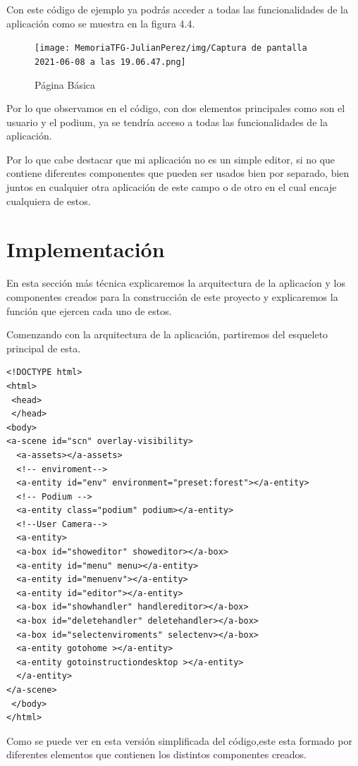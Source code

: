 \documentclass[a4paper, 12pt]{book}
\begin{document}
Con este código de ejemplo ya podrás acceder a todas las funcionalidades de la aplicación como se muestra en la figura 4.4.

\begin{figure}[H]
  \centering
  \texttt{[image: MemoriaTFG-JulianPerez/img/Captura de pantalla 2021-06-08 a las 19.06.47.png]}
  \caption{Página Básica }\label{home}
\end{figure}

Por lo que observamos en el código, con dos elementos principales como son el usuario y el podium, ya se tendría acceso a todas las funcionalidades de la aplicación.

Por lo que cabe destacar que mi aplicación no es un simple editor, si no que contiene diferentes componentes que pueden ser usados bien por separado, bien juntos en cualquier otra aplicación de este campo o de otro en el cual encaje cualquiera de estos.

\section{Implementación} 
\label{sec:Arquitectura resultante}
En esta sección más técnica explicaremos la arquitectura de la aplicacíon y los componentes creados para la construcción de este proyecto y explicaremos la función que ejercen cada uno de estos.

Comenzando con la arquitectura de la aplicación, partiremos del esqueleto principal de esta.

\begin{verbatim}
<!DOCTYPE html>
<html>
 <head>
 </head>
<body>
<a-scene id="scn" overlay-visibility>
  <a-assets></a-assets>
  <!-- enviroment-->
  <a-entity id="env" environment="preset:forest"></a-entity>
  <!-- Podium -->
  <a-entity class="podium" podium></a-entity> 
  <!--User Camera-->
  <a-entity>
  <a-box id="showeditor" showeditor></a-box>
  <a-entity id="menu" menu></a-entity>
  <a-entity id="menuenv"></a-entity>
  <a-entity id="editor"></a-entity>
  <a-box id="showhandler" handlereditor></a-box>
  <a-box id="deletehandler" deletehandler></a-box>
  <a-box id="selectenviroments" selectenv></a-box>
  <a-entity gotohome ></a-entity>
  <a-entity gotoinstructiondesktop ></a-entity>
  </a-entity>
</a-scene>
 </body>
</html> 
\end{verbatim}

Como se puede ver en esta versión simplificada del código,este esta formado por diferentes elementos que contienen los distintos componentes creados.
\end{document}
